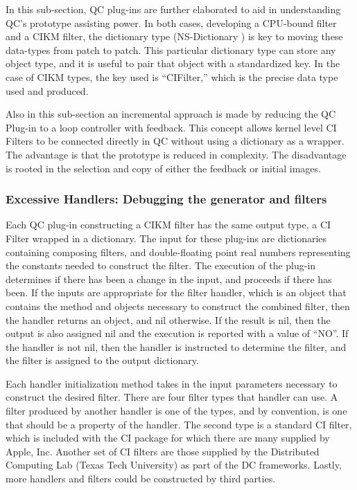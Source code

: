 \documentclass[11pt]{article}
\begin{document}
In this sub-section, QC plug-ins are further elaborated to aid in understanding QC's prototype assisting power.  In both cases, developing a CPU-bound filter and a CIKM filter, the dictionary type (NS-Dictionary ) is key to moving these data-types from patch to patch.  This particular dictionary type can store any object type, and it is useful to pair that object with a standardized key.  In the case of CIKM types, the key used is ``CIFilter,'' which is the precise data type used and produced.  

Also in this sub-section an incremental approach is made by reducing the QC Plug-in to a loop controller with feedback.  This concept allows kernel level CI Filters to be connected directly in QC without using a dictionary as a wrapper.  The advantage is that the prototype is reduced in complexity.  The disadvantage is rooted in the selection and copy of either the feedback or initial images.  

\subsubsection{Excessive Handlers: Debugging the generator and filters}
 
Each QC plug-in constructing a CIKM filter has the same output type, a CI Filter wrapped in a dictionary.  The input for these plug-ins are dictionaries containing composing filters, and double-floating point real numbers representing the constants needed to construct the filter.   
The execution of the plug-in determines if there has been a change in the input, and proceeds if there has been.  
If the inputs are appropriate for the filter handler, which is an object that contains the method and objects necessary to construct the combined filter, then the handler returns an object, and nil otherwise.  If the result is nil, then the output is also assigned nil and the execution is reported with a value of ``NO''.  If the handler is not nil, then the handler is instructed to determine the filter, and the filter is assigned to the output dictionary.


Each handler initialization method takes in the input parameters necessary to construct the desired filter.  There are four filter types that handler can use.  A filter produced by another handler is one of the types, and by convention, is one that should be a property of the handler.  The second type is a standard CI filter, which is included with the CI package for which there are many  supplied by Apple, Inc.  Another set of CI filters  are those supplied by the Distributed Computing Lab (Texas Tech University) as part of the DC frameworks.   Lastly, more handlers and filters could be constructed by third parties.
\end{document}
